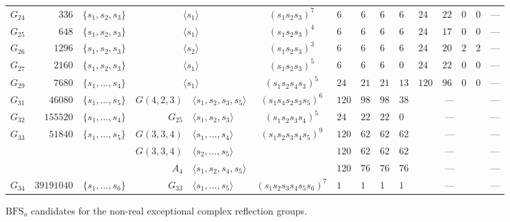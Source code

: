 \documentclass[11pt, reqno]{amsart}
\numberwithin{equation}{section}
\theoremstyle{remark}
\begin{document}
\begin{figure}[tbp]
\begin{adjustbox}{max width=\textwidth}
\begin{tabular}{c|r|c|r@{${}={}$}l|c||w{c}{\bfscol}w{c}{\bfscol}w{c}{\bfscol}w{c}{\bfscol}||w{c}{\bfscol}w{c}{\bfscol}w{c}{\bfscol}w{c}{\bfscol}||w{c}{\bfscol}w{c}{\bfscol}w{c}{\bfscol}w{c}{\bfscol}}
				$G_{24}$ & $336$ & $\{s_1,s_2,s_3\}$ &  & $(s_1s_2s_3)^7$ & $6$ & $6$ & $6$ & $6$ & $24$ & $22$ & $0$ & $0$ &  \\
				$G_{25}$ & $648$ & $\{s_1,s_2,s_3\}$ &  & $(s_1s_2s_3)^4$ & $6$ & $6$ & $6$ & $6$ & $24$ & $17$ & $0$ & $0$ &  \\
				$G_{26}$ & $1296$ & $\{s_1,s_2,s_3\}$ &  & $(s_1s_2s_3)^3$ & $6$ & $6$ & $6$ & $6$ & $24$ & $20$ & $2$ & $2$ &  \\
				$G_{27}$ & $2160$ & $\{s_1,s_2,s_3\}$ &  & $(s_1s_2s_3)^5$ & $6$ & $6$ & $6$ & $0$ & $24$ & $22$ & $0$ & $0$ &  \\
				$G_{29}$ & $7680$ & $\{s_1,\dots,s_4\}$ &  & $(s_1s_2s_4s_3)^5$ & $24$ & $21$ & $21$ & $13$ & $120$ & $96$ & $0$ & $0$ &  \\
				\hline\hline
				$G_{31}$ & $46080$ & $\{s_1,\dots,s_5\}$ & $G(4,2,3)$ & $\langle s_1,s_2,s_3,s_5\rangle$ & $(s_1s_4s_2s_3s_5)^6$ & $120$ & $98$ & $98$ & $38$ &  &  \\
				$G_{32}$ & $155520$ & $\{s_1,\dots,s_4\}$ & $G_{25}$ & $\langle s_1,s_2,s_3\rangle$ & $(s_1s_2s_3s_4)^5$ & $24$ & $22$ & $22$ & $0$ &  &  \\
				$G_{33}$ & $51840$ & $\{s_1,\dots,s_5\}$ & $G(3,3,4)$ & $\langle s_1,\dots,s_4\rangle$ & $(s_1s_2s_3s_4s_5)^9$ & $120$ & $62$ & $62$ & $62$ &  &  \\
				&  &  & $G(3,3,4)$ & $\langle s_2,\dots,s_5\rangle$ &  & $120$ & $62$ & $62$ & $62$ &  &  \\
				&  &  & $A_4$ & $\langle s_1,s_2,s_4,s_5\rangle$ &  & $120$ & $76$ & $76$ & $76$ &  &  \\
				$G_{34}$\footnotemark & $39191040$ & $\{s_1,\dots,s_6\}$ & $G_{33}$ & $\langle s_1,\dots,s_5\rangle$ & $(s_1s_2s_3s_4s_5s_6)^7$ & $1$ & $1$ & $1$ & $1$ &  & 
			\end{tabular}
		\end{adjustbox}
		\caption{$\mathrm{BFS}_o$ candidates for the non-real exceptional complex
			reflection groups. }
		\label{bfs}\label{tbp}
	\end{figure}
	
\end{document}
